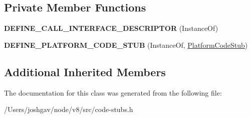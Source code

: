 \subsection*{Private Member Functions}
\begin{DoxyCompactItemize}
\item 
{\bfseries D\+E\+F\+I\+N\+E\+\_\+\+C\+A\+L\+L\+\_\+\+I\+N\+T\+E\+R\+F\+A\+C\+E\+\_\+\+D\+E\+S\+C\+R\+I\+P\+T\+OR} (Instance\+Of)\hypertarget{classv8_1_1internal_1_1_instance_of_stub_a8a703ec475d03482702e7d980d9867ae}{}\label{classv8_1_1internal_1_1_instance_of_stub_a8a703ec475d03482702e7d980d9867ae}

\item 
{\bfseries D\+E\+F\+I\+N\+E\+\_\+\+P\+L\+A\+T\+F\+O\+R\+M\+\_\+\+C\+O\+D\+E\+\_\+\+S\+T\+UB} (Instance\+Of, \hyperlink{classv8_1_1internal_1_1_platform_code_stub}{Platform\+Code\+Stub})\hypertarget{classv8_1_1internal_1_1_instance_of_stub_ab2ea63168670c45aa1eb46675e5009cb}{}\label{classv8_1_1internal_1_1_instance_of_stub_ab2ea63168670c45aa1eb46675e5009cb}

\end{DoxyCompactItemize}
\subsection*{Additional Inherited Members}


The documentation for this class was generated from the following file\+:\begin{DoxyCompactItemize}
\item 
/\+Users/joshgav/node/v8/src/code-\/stubs.\+h\end{DoxyCompactItemize}
